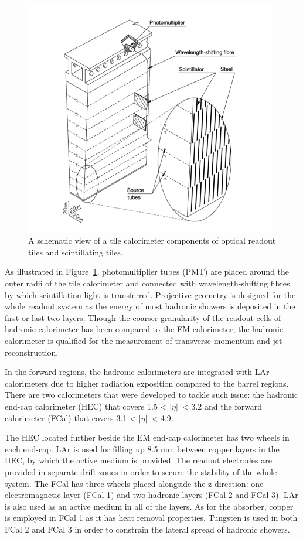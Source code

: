 \documentclass[UTF8,12pt]{ctexart}
\numberwithin{equation}{section}
\def\abseta{$|$$\eta$$|$~}
\begin{document}
\begin{description}
\begin{figure}[htb] 
	\centering  
	\includegraphics[width=11cm]{./fig/tile11.png}	\caption{A schematic view of a tile calorimeter components of optical readout tiles and scintillating tiles.}
	\label{Fig.Tile1}
\end{figure}

As illustrated in Figure~\ref{Fig.Tile1},  photomultiplier tubes (PMT) are placed around the outer radii of the tile calorimeter and connected with wavelength-shifting fibres by which scintillation light is transferred. Projective geometry is designed for the whole readout system as the energy of most hadronic showers is deposited in the first or last two layers.  Though the coarser granularity of the readout cells of hadronic calorimeter has been compared to the EM calorimeter, the hadronic calorimeter is qualified for the measurement of transverse momentum and jet reconstruction.

In the forward regions, the hadronic calorimeters are integrated with LAr calorimeters due to higher radiation exposition compared to the barrel regions. There are two calorimeters that were developed to tackle such issue: the hadronic end-cap calorimeter (HEC) that covers 1.5 < \abseta < 3.2 and the forward calorimeter (FCal) that covers 3.1 < \abseta < 4.9.

The HEC located further beside the EM end-cap calorimeter has two wheels in each end-cap.  LAr is used for filling up 8.5 mm between copper layers in the HEC, by which the active medium is provided. The readout electrodes are provided in separate drift zones in order to secure the stability of the whole system.  The FCal has three wheels placed alongside the z-direction: one electromagnetic layer (FCal 1) and two hadronic layers (FCal 2 and FCal 3). LAr is also used as an active medium in all of the layers. As for the absorber, copper is employed in FCal 1 as it has heat removal properties.  Tungsten is used in both FCal 2 and FCal 3 in order to constrain the lateral spread of hadronic showers. 
\end{description}
\end{document}
